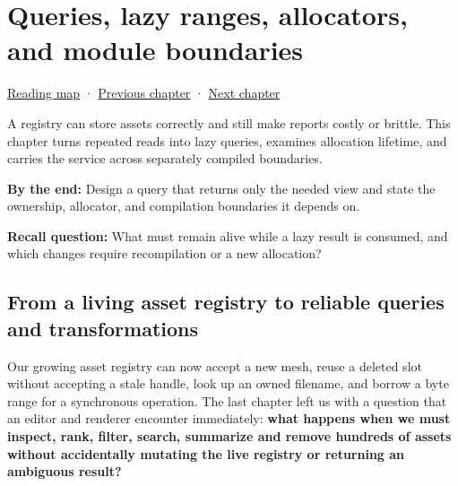 \chapter{Queries, lazy ranges, allocators, and module boundaries}\label{05-engine-i-ch006-queries-lazy-ranges-allocators-and-module-boundaries}\hypertarget{05-engine-i-ch006}{}\label{stagechapter:05-engine-i-ch006}

\hypertarget{05-engine-i-ch006-queries-lazy-ranges-allocators-and-module-boundaries}{}

\hyperref[volume-reading-map]{Reading map} · \hyperref[05-engine-i-ch005-generic-asset-pipelines-with-stable-identity]{Previous chapter} · \hyperref[05-engine-i-ch007-typed-apis-and-measured-cpu-data-structures]{Next chapter}

A registry can store assets correctly and still make reports costly or brittle. This chapter turns repeated reads into lazy queries, examines allocation lifetime, and carries the service across separately compiled boundaries.

\textbf{By the end:} Design a query that returns only the needed view and state the ownership, allocator, and compilation boundaries it depends on.

\textbf{Recall question:} What must remain alive while a lazy result is consumed, and which changes require recompilation or a new allocation?

\section{From a living asset registry to reliable queries and transformations}\label{05-engine-i-ch006-from-a-living-asset-registry-to-reliable-queries-and-transformations}

\hypertarget{05-engine-i-ch006-from-a-living-asset-registry-to-reliable-queries-and-transformations}{}

Our growing asset registry can now accept a new mesh, reuse a deleted slot without accepting a stale handle, look up an owned filename, and borrow a byte range for a synchronous operation. The last chapter left us with a question that an editor and renderer encounter immediately: \textbf{what happens when we must inspect, rank, filter, search, summarize and remove hundreds of assets without accidentally mutating the live registry or returning an ambiguous result?}

